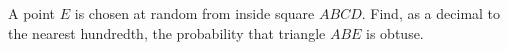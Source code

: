 A point $E$ is chosen at random from inside square $ABCD$. Find, as a decimal to the nearest hundredth, the probability that triangle $ABE$ is obtuse.
